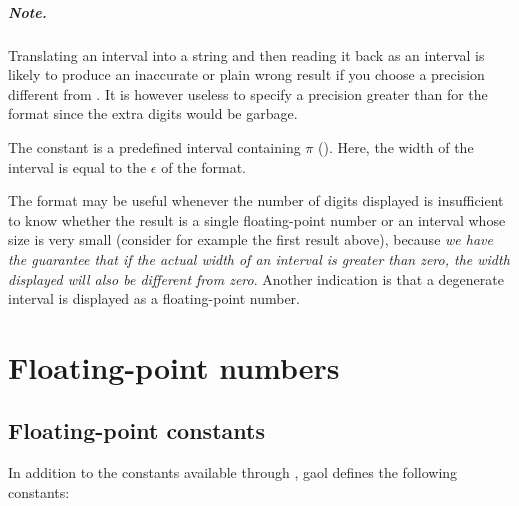 \documentclass{manual}
\begin{document}
\paragraph*{Note.} Translating an interval into a string and then reading it back
as an interval is likely to produce an inaccurate or plain wrong result if you
choose a precision different from . It is however useless to specify a
precision greater than  for the  format since the extra
digits would be garbage.

The  constant is a predefined 
interval containing $\pi$ (). Here,
the width of the interval is equal to the $\epsilon$ of
the format.

The  format may be useful whenever the number of
digits displayed is insufficient to know whether the result is a single
floating-point number or an interval whose size is very small (consider
for example the first result above), because \emph{we have the guarantee that
if the actual width of an interval is greater than zero, the width
displayed will also be different from zero}. Another indication is that a degenerate
interval is displayed as a floating-point number.

\chapter{Floating-point numbers}

\section{Floating-point constants}\label{sec:floating-point-constants}

In addition to the constants available through ,
gaol defines the following  constants:
\end{document}
